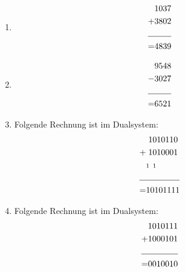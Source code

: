 \documentclass[DIN, pagenumber=false, fontsize=11pt, parskip=half]{scrartcl}
\begin{document}
    \subsection{}
    \begin{enumerate}[label = (\alph*)]
        \item 
            \begin{align*}
                & 1037 \\
                + & \hspace{0.0cm} 3802  \\
                \cline{1-2}  
                = &4839  
            \end{align*}
        \item 
            \begin{align*}
                & 9548\\
                - & \hspace{0.0cm} 3027  \\
                \cline{1-2}  
                = &6521  
            \end{align*}
        \item Folgende Rechnung ist im Dualsystem:
            \begin{align*}
                & \hspace{0.1cm} 1010110\\
                + & \hspace{0.1cm}1010001 \\
                & \hspace{0.0cm} {\scriptstyle 1\, \, \, 1} \\
                \cline{1-2}  
                = &10101111
            \end{align*}
        \item Folgende Rechnung ist im Dualsystem:
            \begin{align*}
                & \hspace{0.0cm} 1010111\\
                + & \hspace{0.0cm}1000101 \\
                \cline{1-2}  
                = &0010010
            \end{align*}
    \end{enumerate}
\end{document}
